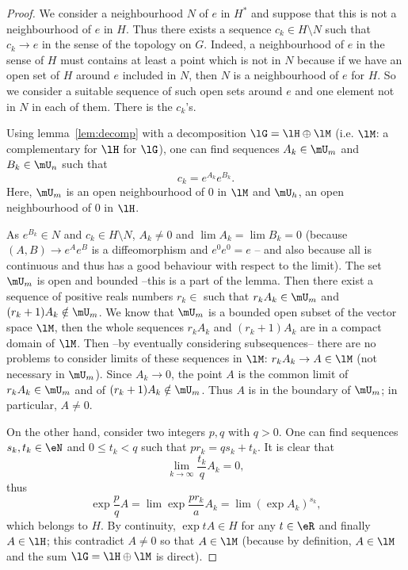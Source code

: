 \begin{proof}
We consider a neighbourhood $N$ of $e$ in $H^*$ and suppose that this is not a neighbourhood of $e$ in $H$. Thus there exists a sequence $c_k\in H\setminus N$ such that $c_k\to e$ in the sense of the topology on $G$. Indeed, a neighbourhood of $e$ in the sense of $H$ must contains at least a point which is not in $N$ because if we have an open set of $H$ around $e$ included in $N$, then $N$ is a neighbourhood of $e$ for $H$. So we consider a suitable sequence of such open sets around $e$ and one element not in $N$ in each of them. There is the $c_k$'s.

Using lemma~\ref{lem:decomp} with a decomposition $\lG=\lH\oplus\lM$ (i.e. $\lM$: a complementary for $\lH$ for $\lG$), one can find sequences $A_k\in\mU_m$ and $B_k\in\mU_n$ such that
\[
   c_k=e^{A_k}e^{B_k}.
\]
Here, $\mU_m$ is an open neighbourhood of $0$ in $\lM$ and $\mU_h$, an open neighbourhood of $0$ in $\lH$.

As $e^{B_k}\in N$ and $c_k\in H\setminus N$, $A_k\neq 0$ and $\lim A_k=\lim B_k=0$ (because $(A,B)\to e^Ae^B$ is a diffeomorphism and $e^0e^0=e$ -- and also because all is continuous and thus has a good behaviour with respect to the limit). The set $\mU_m$ is open and bounded --this is a part of the lemma. Then there exist a sequence of positive reals numbers $r_k\in$ such that $r_kA_k\in\mU_m$ and $(r_k+1)A_k\notin\mU_m$. We know that $\mU_m$ is a bounded open subset of the vector space $\lM$, then the whole sequences $r_kA_k$ and $(r_k+1)A_k$ are in a compact domain of $\lM$. Then --by eventually considering subsequences-- there are no problems to consider limits of these sequences in $\lM$: $r_kA_k\to A\in\lM$ (not necessary in $\mU_m$). Since $A_k\to 0$, the point $A$ is the common limit of $r_kA_k\in\mU_m$ and of $(r_k+1)A_k\notin\mU_m$. Thus $A$ is in the boundary of $\mU_m$; in particular, $A\neq 0$.

On the other hand, consider two integers $p,q$ with $q>0$. One can find sequences $s_k,t_k\in\eN$ and $0\leq t_k<q$ such that $pr_k=qs_k+t_k$. It is clear that
\begin{equation}
  \lim_{k\to\infty}\frac{t_k}{q}A_k=0,
\end{equation}
thus
\[
   \exp \frac{p}{q}A=\lim \exp\frac{pr_k}{a}A_k=\lim (\exp A_k)^{s_k},
\]
which belongs to $H$. By continuity, $\exp tA\in H$ for any $t\in\eR$ and finally $A\in\lH$; this contradict $A\neq 0$ so that $A\in\lM$ (because by definition, $A\in\lM$ and the sum $\lG=\lH\oplus\lM$ is direct).


\end{proof}
